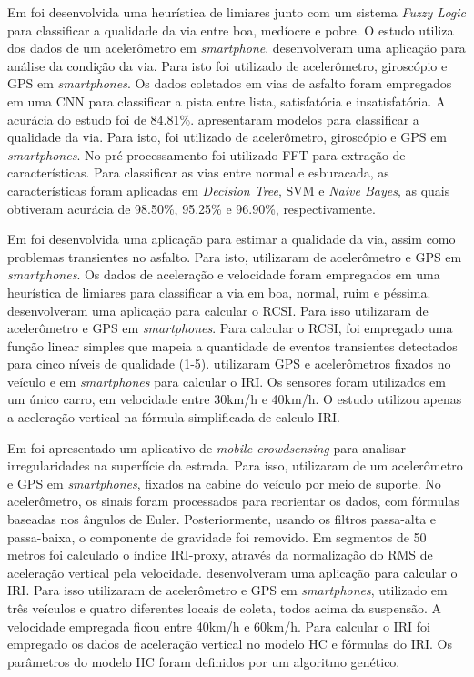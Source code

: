 Em \cite{Badurowicz2020} foi desenvolvida uma heurística de limiares junto com um sistema \textit{Fuzzy Logic} para classificar a qualidade da via entre boa, medíocre e pobre. O estudo utiliza dos dados de um acelerômetro em \textit{smartphone}. \cite{Leizerovych2020} desenvolveram uma aplicação para análise da condição da via. Para isto foi utilizado de acelerômetro, giroscópio e GPS em \textit{smartphones}. Os dados coletados em vias de asfalto foram empregados em uma CNN para classificar a pista entre lista, satisfatória e insatisfatória. A acurácia do estudo foi de 84.81\%. \cite{Allouch2017} apresentaram modelos para classificar a qualidade da via. Para isto, foi utilizado de acelerômetro, giroscópio e GPS em \textit{smartphones}. No pré-processamento foi utilizado FFT para extração de características. Para classificar as vias entre normal e esburacada, as características foram aplicadas em \textit{Decision Tree}, SVM e \textit{Naive Bayes}, as quais obtiveram acurácia de 98.50\%, 95.25\% e 96.90\%, respectivamente.

Em \cite{Lima2016}  foi desenvolvida uma aplicação para estimar a qualidade da via, assim como problemas transientes no asfalto. Para isto, utilizaram de acelerômetro e GPS em \textit{smartphones}. Os dados de aceleração e velocidade foram empregados em uma heurística de limiares para classificar a via em boa, normal, ruim e péssima.
\cite{Brunauer2016} desenvolveram uma aplicação para calcular o RCSI. Para isso utilizaram de acelerômetro e GPS em \textit{smartphones}. Para calcular o RCSI, foi empregado uma função linear simples que mapeia a quantidade de eventos transientes detectados para cinco níveis de qualidade (1-5). \cite{AbdelRaheem2020} utilizaram GPS e acelerômetros fixados no veículo e em \textit{smartphones} para calcular o IRI. Os sensores foram utilizados em um único carro, em velocidade entre 30km/h e 40km/h. O estudo utilizou apenas a aceleração vertical na fórmula simplificada de calculo IRI. 

Em \cite{Li2018} foi apresentado um aplicativo de \textit{mobile crowdsensing} para analisar irregularidades na superfície da estrada. Para isso, utilizaram de um acelerômetro e GPS em \textit{smartphones}, fixados na cabine do veículo por meio de suporte. No acelerômetro, os sinais foram processados para reorientar os dados, com fórmulas baseadas nos ângulos de Euler. Posteriormente, usando os filtros passa-alta e passa-baixa, o componente de gravidade foi removido. Em segmentos de 50 metros foi calculado o índice IRI-proxy, através da normalização do RMS de aceleração vertical pela velocidade. \cite{Zhao2016} desenvolveram uma aplicação para calcular o IRI. Para isso utilizaram de acelerômetro e GPS em \textit{smartphones}, utilizado em três veículos e quatro diferentes locais de coleta, todos acima da suspensão. A velocidade empregada ficou entre 40km/h e 60km/h. Para calcular o IRI foi empregado os dados de aceleração vertical no modelo HC e fórmulas do IRI. Os parâmetros do modelo HC foram definidos por um algoritmo genético.

